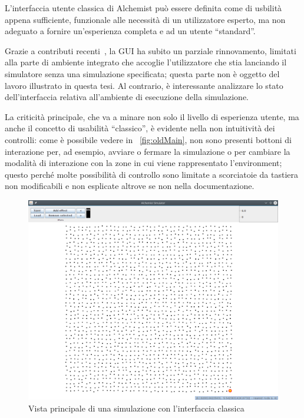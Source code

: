             L'interfaccia utente classica di Alchemist può essere definita come di usbilità appena sufficiente, funzionale alle necessità di un utilizzatore esperto, ma non adeguato a fornire un'esperienza completa e  ad un utente ``standard''.


            Grazie a contributi recenti~\cite{casadio}, la GUI ha subito un parziale rinnovamento, limitati alla parte di ambiente integrato che accoglie l'utilizzatore che stia lanciando il simulatore senza una simulazione specificata; questa parte non è oggetto del lavoro illustrato in questa tesi. Al contrario, è interessante analizzare lo stato dell'interfaccia relativa all'ambiente di esecuzione della simulazione.

            La criticità principale, che va a minare non solo il livello di esperienza utente, ma anche il concetto di usabilità  ``classico'', è evidente nella non intuitività dei controlli: come è possibile vedere in \figurename~\vref{fig:oldMain}, non sono presenti bottoni di interazione per, ad esempio, avviare o fermare la simulazione o per cambiare la modalità di interazione con la zone in cui viene rappresentato l'environment; questo perché molte possibilità di controllo sono limitate a scorciatoie da tastiera non modificabili e non esplicate altrove se non nella documentazione.

            \begin{figure}[htbp]\label{fig:oldMain}
                \includegraphics[scale=.35]{img/oldMain}
                \caption{Vista principale di una simulazione con l'interfaccia classica}
            \end{figure}

